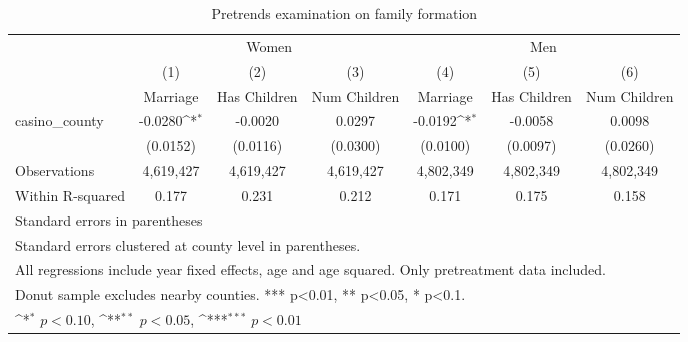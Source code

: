 \begin{table}[htbp]\centering
\def\sym#1{\ifmmode^{#1}\else\(^{#1}\)\fi}
\caption{Pretrends examination on family formation}
\begin{tabular}{l*{6}{c}}
\hline\hline
            &\multicolumn{3}{c}{Women}                                        &\multicolumn{3}{c}{Men}                                          \\\cmidrule(lr){2-4}\cmidrule(lr){5-7}
            &\multicolumn{1}{c}{(1)}&\multicolumn{1}{c}{(2)}&\multicolumn{1}{c}{(3)}&\multicolumn{1}{c}{(4)}&\multicolumn{1}{c}{(5)}&\multicolumn{1}{c}{(6)}\\
            &\multicolumn{1}{c}{Marriage}&\multicolumn{1}{c}{Has Children}&\multicolumn{1}{c}{Num Children}&\multicolumn{1}{c}{Marriage}&\multicolumn{1}{c}{Has Children}&\multicolumn{1}{c}{Num Children}\\
\hline
casino\_county&     -0.0280\sym{*}  &     -0.0020         &      0.0297         &     -0.0192\sym{*}  &     -0.0058         &      0.0098         \\
            &    (0.0152)         &    (0.0116)         &    (0.0300)         &    (0.0100)         &    (0.0097)         &    (0.0260)         \\
\hline
Observations&   4,619,427         &   4,619,427         &   4,619,427         &   4,802,349         &   4,802,349         &   4,802,349         \\
Within R-squared&       0.177         &       0.231         &       0.212         &       0.171         &       0.175         &       0.158         \\
\hline\hline
\multicolumn{7}{l}{\footnotesize Standard errors in parentheses}\\
\multicolumn{7}{l}{\footnotesize Standard errors clustered at county level in parentheses.}\\
\multicolumn{7}{l}{\footnotesize All regressions include year fixed effects, age and age squared. Only pretreatment data included.}\\
\multicolumn{7}{l}{\footnotesize Donut sample excludes nearby counties. *** p<0.01, ** p<0.05, * p<0.1.}\\
\multicolumn{7}{l}{\footnotesize \sym{*} \(p<0.10\), \sym{**} \(p<0.05\), \sym{***} \(p<0.01\)}\\
\end{tabular}
\end{table}
